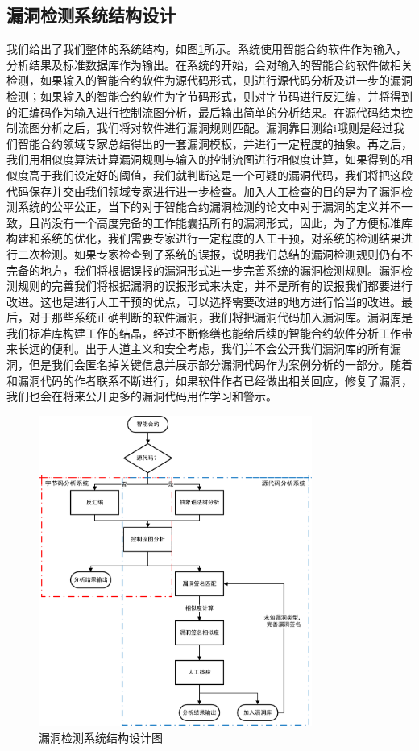 \subsection{漏洞检测系统结构设计}
我们给出了我们整体的系统结构，如图\ref{fig:system_diagram}所示。系统使用智能合约软件作为输入，分析结果及标准数据库作为输出。在系统的开始，会对输入的智能合约软件做相关检测，如果输入的智能合约软件为源代码形式，则进行源代码分析及进一步的漏洞检测；如果输入的智能合约软件为字节码形式，则对字节码进行反汇编，并将得到的汇编码作为输入进行控制流图分析，最后输出简单的分析结果。在源代码结束控制流图分析之后，我们将对软件进行漏洞规则匹配。漏洞靠目测给i哦则是经过我们智能合约领域专家总结得出的一套漏洞模板，并进行一定程度的抽象。再之后，我们用相似度算法计算漏洞规则与输入的控制流图进行相似度计算，如果得到的相似度高于我们设定好的阈值，我们就判断这是一个可疑的漏洞代码，我们将把这段代码保存并交由我们领域专家进行进一步检查。加入人工检查的目的是为了漏洞检测系统的公平公正，当下的对于智能合约漏洞检测的论文中对于漏洞的定义并不一致，且尚没有一个高度完备的工作能囊括所有的漏洞形式，因此，为了方便标准库构建和系统的优化，我们需要专家进行一定程度的人工干预，对系统的检测结果进行二次检测。如果专家检查到了系统的误报，说明我们总结的漏洞检测规则仍有不完备的地方，我们将根据误报的漏洞形式进一步完善系统的漏洞检测规则。漏洞检测规则的完善我们将根据漏洞的误报形式来决定，并不是所有的误报我们都要进行改进。这也是进行人工干预的优点，可以选择需要改进的地方进行恰当的改进。最后，对于那些系统正确判断的软件漏洞，我们将把漏洞代码加入漏洞库。漏洞库是我们标准库构建工作的结晶，经过不断修缮也能给后续的智能合约软件分析工作带来长远的便利。出于人道主义和安全考虑，我们并不会公开我们漏洞库的所有漏洞，但是我们会匿名掉关键信息并展示部分漏洞代码作为案例分析的一部分。随着和漏洞代码的作者联系不断进行，如果软件作者已经做出相关回应，修复了漏洞，我们也会在将来公开更多的漏洞代码用作学习和警示。
\begin{figure}[b]
\vspace{+2mm}
  \centering
  \includegraphics[width=0.8\textwidth]{figures/system_diagram.png}
  \caption{漏洞检测系统结构设计图}
  \label{fig:system_diagram}
\vspace{-5mm}
\end{figure}

